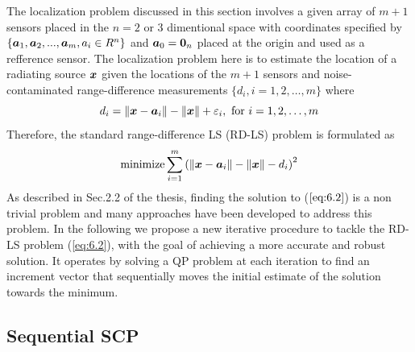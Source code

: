 The localization problem discussed in this section involves a given array of $m+1$ sensors placed in the $n = 2$ or 3 dimentional space with coordinates specified by $\{\mbox{\boldmath$a$}_1, \mbox{\boldmath$a$}_2, . . . , \mbox{\boldmath$a$}_m , a_i \in R^n\}$ and  $\mbox{\boldmath$a$}_0 = \mbox{\boldmath${0}$}_n$ placed at the origin and used as a refference sensor. The localization problem here is to estimate the location of a radiating source $\mbox{\boldmath$x$}$ given the locations of the $m+1$ sensors and noise-contaminated range-difference measurements $\{d_i, i = 1, 2, \ldots, m\}$ where 
\begin{equation} \label{eq:6.1}
d_i = \|\mbox{\boldmath$x$} - \mbox{\boldmath$a$}_i\| - \|\mbox{\boldmath$x$}\| + \varepsilon_i, \mbox{ for } i = 1, 2, \ldots, m
\end{equation}
Therefore, the standard range-difference LS (RD-LS) problem is formulated as
\begin{equation} \label{eq:6.2}
\mathop{\mbox{minimize}} \sum^m_{i=1}\left( \|\mbox{\boldmath$x$} - \mbox{\boldmath$a$}_i\| - \|\mbox{\boldmath$x$}\| - d_i\right)^2
\end{equation}
As described in Sec.2.2 of the thesis, finding the solution to ($\ref{eq:6.2}$) is a non trivial problem and many approaches have been developed to address this problem. In the following we propose a new iterative procedure to tackle the RD-LS problem (\ref{eq:6.2}), with the goal of achieving a more accurate and robust solution. It operates by  solving a QP problem at each iteration to find an increment vector  that sequentially moves the initial estimate of the solution towards the minimum.

\subsection{Sequential SCP}

%

